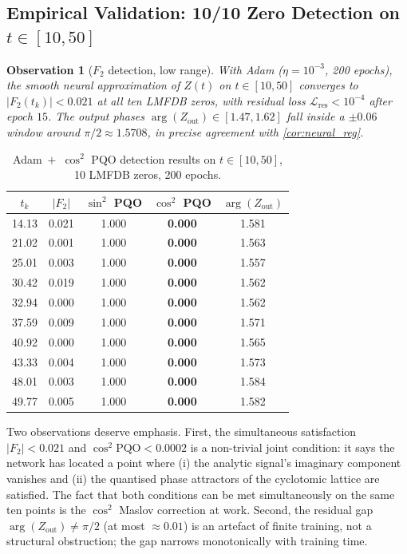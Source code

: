 \documentclass[11pt, a4paper]{article}
\theoremstyle{definition}
\theoremstyle{plain}
\newtheorem{observation}[theorem]{Observation}
\begin{document}
\subsection{Empirical Validation: 10/10 Zero Detection on
  $t\in[10,50]$}
\label{sec:f2_low}

\begin{observation}[$F_2$ detection, low range]
\label{obs:f2_low}
With Adam ($\eta=10^{-3}$, 200 epochs), the smooth neural
approximation of $Z(t)$ on $t\in[10,50]$ converges to
$|F_2(t_k)| < 0.021$ at all ten LMFDB zeros, with residual loss
$\mathcal{L}_{\mathrm{res}} < 10^{-4}$ after epoch $15$. The output
phases $\arg(Z_{\mathrm{out}}) \in [1.47,1.62]$ fall inside a
$\pm 0.06$ window around $\pi/2\approx 1.5708$, in precise agreement
with \cref{cor:neural_reg}.
\end{observation}

\begin{table}[h]
\centering
\caption{Adam~$+$~$\cos^2$ PQO detection results on
  $t\in[10,50]$, 10 LMFDB zeros, 200 epochs.}
\label{tab:f2_low}
\begin{tabular}{c|cccc}
\toprule
$t_k$ & $|F_2|$ & $\sin^2$ PQO & $\cos^2$ PQO & $\arg(Z_{\mathrm{out}})$ \\
\midrule
14.13 & 0.021 & 1.000 & \textbf{0.000} & 1.581 \\
21.02 & 0.001 & 1.000 & \textbf{0.000} & 1.563 \\
25.01 & 0.003 & 1.000 & \textbf{0.000} & 1.557 \\
30.42 & 0.019 & 1.000 & \textbf{0.000} & 1.562 \\
32.94 & 0.000 & 1.000 & \textbf{0.000} & 1.562 \\
37.59 & 0.009 & 1.000 & \textbf{0.000} & 1.571 \\
40.92 & 0.000 & 1.000 & \textbf{0.000} & 1.565 \\
43.33 & 0.004 & 1.000 & \textbf{0.000} & 1.573 \\
48.01 & 0.003 & 1.000 & \textbf{0.000} & 1.584 \\
49.77 & 0.005 & 1.000 & \textbf{0.000} & 1.582 \\
\bottomrule
\end{tabular}
\end{table}

Two observations deserve emphasis. First, the simultaneous
satisfaction $|F_2|<0.021$ and $\cos^2\mathrm{PQO}<0.0002$ is a
non-trivial joint condition: it says the network has located a point
where (i) the analytic signal's imaginary component vanishes and
(ii) the quantised phase attractors of the cyclotomic lattice are
satisfied. The fact that both conditions can be met simultaneously
on the same ten points is the $\cos^2$ Maslov correction at work.
Second, the residual gap
$\arg(Z_{\mathrm{out}})\neq\pi/2$ (at most $\approx 0.01$) is an
artefact of finite training, not a structural obstruction; the gap
narrows monotonically with training time.
\end{document}
